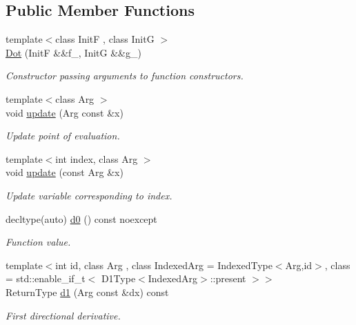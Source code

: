 \subsection*{Public Member Functions}
\begin{DoxyCompactItemize}
\item 
{\footnotesize template$<$class Init\-F , class Init\-G $>$ }\\\hyperlink{structFunG_1_1MathematicalOperations_1_1Dot_a00296551bc83a77626503ef10e509de7}{Dot} (Init\-F \&\&f\-\_\-, Init\-G \&\&g\-\_\-)
\begin{DoxyCompactList}\small\item\em Constructor passing arguments to function constructors. \end{DoxyCompactList}\item 
{\footnotesize template$<$class Arg $>$ }\\void \hyperlink{structFunG_1_1MathematicalOperations_1_1Dot_a76ef6519450242a03fea26fe0671c8af}{update} (Arg const \&x)
\begin{DoxyCompactList}\small\item\em Update point of evaluation. \end{DoxyCompactList}\item 
{\footnotesize template$<$int index, class Arg $>$ }\\void \hyperlink{structFunG_1_1MathematicalOperations_1_1Dot_a9b75f8b451473b48f2a35ba2319d5287}{update} (const Arg \&x)
\begin{DoxyCompactList}\small\item\em Update variable corresponding to index. \end{DoxyCompactList}\item 
decltype(auto) \hyperlink{structFunG_1_1MathematicalOperations_1_1Dot_accd0cb2e43edf14a6843ed389947b175}{d0} () const noexcept
\begin{DoxyCompactList}\small\item\em Function value. \end{DoxyCompactList}\item 
{\footnotesize template$<$int id, class Arg , class Indexed\-Arg  = Indexed\-Type$<$\-Arg,id$>$, class  = std\-::enable\-\_\-if\-\_\-t$<$ D1\-Type$<$\-Indexed\-Arg$>$\-::present $>$$>$ }\\Return\-Type \hyperlink{structFunG_1_1MathematicalOperations_1_1Dot_a5539a338fdd0ab52307bdca4bc5c0906}{d1} (Arg const \&dx) const 
\begin{DoxyCompactList}\small\item\em First directional derivative. \end{DoxyCompactList}\item 

\end{DoxyCompactItemize}

